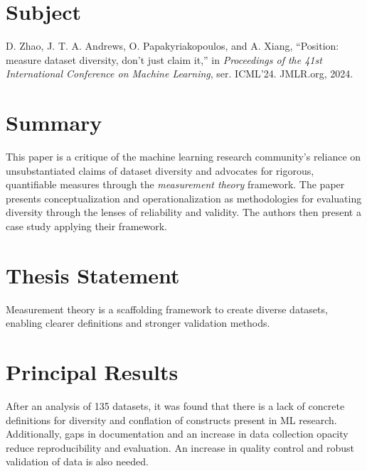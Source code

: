 \documentclass[12pt, letterpaper]{article}
\begin{document}
\pagestyle{empty}
\singlespacing
\vspace{1.0cm}

\newgeometry{} %


\section{Subject}
\label{sec:subject}
D. Zhao, J. T. A. Andrews, O. Papakyriakopoulos, and A. Xiang, “Position: measure dataset diversity, don’t just claim it,” in \emph{Proceedings of the 41st International Conference on Machine Learning}, ser. ICML’24. JMLR.org, 2024.

\section{Summary}
\label{sec:summary}
This paper is a critique of the machine learning research community's reliance on unsubstantiated claims of dataset diversity and advocates for rigorous, quantifiable measures through the \emph{measurement theory} framework. The paper presents conceptualization and operationalization as methodologies for evaluating diversity through the lenses of reliability and validity. The authors then present a case study applying their framework.

\section{Thesis Statement}
\label{sec:thesis}
Measurement theory is a scaffolding framework to create diverse datasets, enabling clearer definitions and stronger validation methods.

\section{Principal Results}
\label{sec:principal}
After an analysis of 135 datasets, it was found that there is a lack of concrete definitions for diversity and conflation of constructs present in ML research. Additionally, gaps in documentation and an increase in data collection opacity reduce reproducibility and evaluation. An increase in quality control and robust validation of data is also needed.
\end{document}
